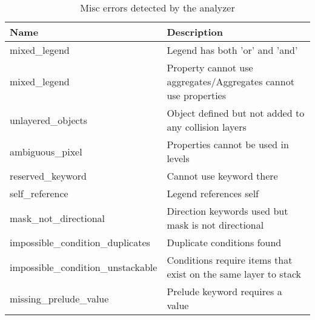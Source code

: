 \begin{table}[!htbp]
\centering
\caption{Misc errors detected by the analyzer}
\label{tab:static_errors_misc}
\scriptsize
\begin{tabular}{ll}
\textbf{Name} & \textbf{Description}                                                                    \\ \hline
mixed\_legend                                       & Legend has both 'or' and 'and'                                                 \\
mixed\_legend                                       & Property cannot use aggregates/Aggregates cannot use properties                \\
unlayered\_objects                                  & Object defined but not added to any collision layers                           \\
ambiguous\_pixel                                    & Properties cannot be used in levels                                            \\
reserved\_keyword                                   & Cannot use keyword there                                                       \\
self\_reference                                     & Legend references self                                                         \\
mask\_not\_directional                              & Direction keywords used but mask is not directional                            \\
impossible\_condition\_duplicates                   & Duplicate conditions found                                                     \\
impossible\_condition\_unstackable                  & Conditions require items that exist on the same layer to stack                 \\
missing\_prelude\_value                             & Prelude keyword requires a value                                               \\
\end{tabular}
\end{table}

